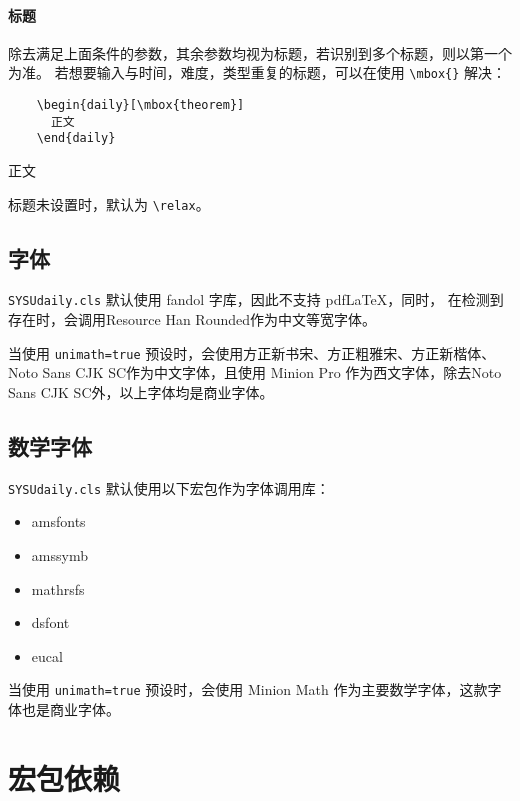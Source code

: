 \documentclass{SYSUDaily}
\begin{document}
\paragraph{标题}
除去满足上面条件的参数，其余参数均视为标题，若识别到多个标题，则以第一个为准。
若想要输入与时间，难度，类型重复的标题，可以在使用 \verb|\mbox{}| 解决：
\begin{multicols}{2}
	\begin{lstlisting}
    \begin{daily}[\mbox{theorem}]
      正文
    \end{daily}
  \end{lstlisting}
	\small
	\begin{daily}
		正文
	\end{daily}
\end{multicols}
标题未设置时，默认为 \verb|\relax|。

\subsection{字体}
\verb|SYSUdaily.cls| 默认使用 \textsf{fandol} 字库，因此不支持 pdf\LaTeX{}，同时，
在检测到存在时，会调用Resource Han Rounded作为中文等宽字体。

当使用 \verb|unimath=true| 预设时，会使用方正新书宋、方正粗雅宋、方正新楷体、Noto Sans CJK SC作为中文字体，且使用 Minion Pro 作为西文字体，除去Noto Sans CJK SC外，以上字体均是商业字体。

\subsection{数学字体}
\label{ssec:math_fonts}
\verb|SYSUdaily.cls| 默认使用以下宏包作为字体调用库：
\begin{itemize}[parsep=0pt,itemsep=0pt]
	\item
			\textsf{amsfonts}
	\item
			\textsf{amssymb}
	\item
			\textsf{mathrsfs}
	\item
			\textsf{dsfont}
	\item
			\textsf{eucal}
\end{itemize}
当使用 \verb|unimath=true| 预设时，会使用 Minion Math 作为主要数学字体，这款字体也是商业字体。

\section{宏包依赖}
\end{document}
